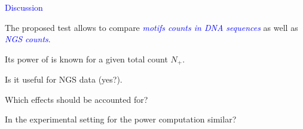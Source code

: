 \documentclass[dvips, lscape]{foils}
\newcommand{\textblue}[1]{\textcolor{blue}{#1}}
\newcommand{\section}[1]{\centerline{\Large \textblue{#1}}}
\newcommand{\subsection}[1]{\noindent{\large \textblue{#1}}}
\newcommand{\emphase}[1]{{\textblue{\sl #1}}}
\newcommand{\paragraph}[1]{\noindent {\textblue{#1}}}
\begin{document}

\newpage
\section{Discussion}




\bigskip
\subsection{What we Past}

The proposed test allows to compare \emphase{motifs counts in DNA
  sequences} as well as \emphase{NGS counts}.

Its power of is known for a given total count $N_+$.

\bigskip\bigskip
\subsection{Future}

Is it useful for NGS data (yes?).

Which effects should be accounted for?

In the experimental setting for the power computation similar?

\end{document}
